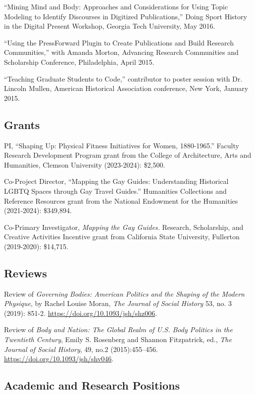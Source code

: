 \documentclass[11pt]{article}
\begin{document}
``Mining Mind and Body: Approaches and Considerations for Using Topic Modeling to Identify Discourses in Digitized Publications,'' Doing Sport History in the Digital Present Workshop, Georgia Tech University, May 2016.

``Using the PressForward Plugin to Create Publications and Build Research Communities,'' with Amanda Morton, Advancing Research Communities and Scholarship Conference, Philadelphia, April 2015.

``Teaching Graduate Students to Code,'' contributor to poster session with Dr. Lincoln Mullen, American Historical Association conference, New York, January 2015.

\subsection{Grants}
PI, ``Shaping Up: Physical Fitness Initiatives for Women, 1880-1965.'' Faculty Research Development Program grant from the College of Architecture, Arts and Humanities, Clemson University (2023-2024): \$2,500.

Co-Project Director, ``Mapping the Gay Guides: Understanding Historical LGBTQ Spaces through Gay Travel Guides.'' Humanities Collections and Reference Resources grant from the National Endowment for the Humanities (2021-2024): \$349,894.

Co-Primary Investigator, \emph{Mapping the Gay Guides.} Research, Scholarship, and Creative Activities Incentive grant from California State University, Fullerton (2019-2020): \$14,715.

\subsection{Reviews}\label{reviews}

Review of \emph{Governing Bodies: American Politics and the Shaping of the Modern Physique}, by Rachel Louise Moran, \emph{The Journal of Social History} 53, no. 3 (2019): 851-2. \url{https://doi.org/10.1093/jsh/shz006}.

Review of \emph{Body and Nation: The Global Realm of U.S. Body Politics in the Twentieth Century}, Emily S. Rosenberg and Shannon Fitzpatrick, ed., \emph{The Journal of Social History}, 49, no.2 (2015):455–456. \url{https://doi.org/10.1093/jsh/shv046}.

\subsection{Academic and Research Positions}
\end{document}
